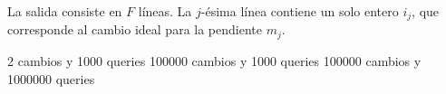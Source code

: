 \documentclass{oci}
\begin{document}
\begin{outputDescription}
La salida consiste en $F$ líneas.
La $j$-ésima línea contiene un solo entero $i_j$, que corresponde al cambio ideal
para la pendiente $m_j$.
\end{outputDescription}

\begin{scoreDescription}
   2 cambios y 1000 queries
   100000 cambios y 1000 queries
   100000 cambios y 1000000 queries
\end{scoreDescription}

\begin{sampleDescription}
\end{sampleDescription}
\end{document}
